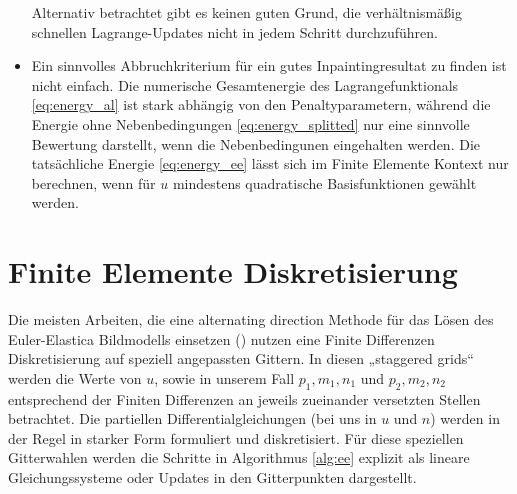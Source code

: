 \documentclass{mythesis}
\begin{document}
\begin{algorithm}
\begin{note}
\begin{itemize}
		Alternativ betrachtet gibt es keinen guten Grund, die verhältnismäßig schnellen Lagrange-Updates nicht in jedem Schritt durchzuführen.
	    \item %
		Ein sinnvolles Abbruchkriterium für ein gutes Inpaintingresultat zu finden ist nicht einfach.
		Die numerische Gesamtenergie des Lagrangefunktionals \eqref{eq:energy_al} ist stark abhängig von den Penaltyparametern, während die Energie ohne Nebenbedingungen \eqref{eq:energy_splitted} nur eine sinnvolle Bewertung darstellt, wenn die Nebenbedingunen eingehalten werden.
		Die tatsächliche Energie \eqref{eq:energy_ee} lässt sich im Finite Elemente Kontext nur berechnen, wenn für $u$ mindestens quadratische Basisfunktionen gewählt werden.

	\end{itemize}
    \end{note}
\end{algorithm}


\section{Finite Elemente Diskretisierung}


Die meisten Arbeiten, die eine alternating direction Methode für das Lösen des Euler-Elastica Bildmodells einsetzen (\cite{??}) nutzen eine Finite Differenzen Diskretisierung auf speziell angepassten Gittern.
In diesen „staggered grids“ werden die Werte von $u$, sowie in unserem Fall $p_1, m_1, n_1$ und $p_2, m_2, n_2$ entsprechend der Finiten Differenzen an jeweils zueinander versetzten Stellen betrachtet.
Die partiellen Differentialgleichungen (bei uns in $u$ und $n$) werden in der Regel in starker Form formuliert und diskretisiert.
Für diese speziellen Gitterwahlen werden die Schritte in Algorithmus \ref{alg:ee} explizit als lineare Gleichungssysteme oder Updates in den Gitterpunkten dargestellt.
\end{document}
